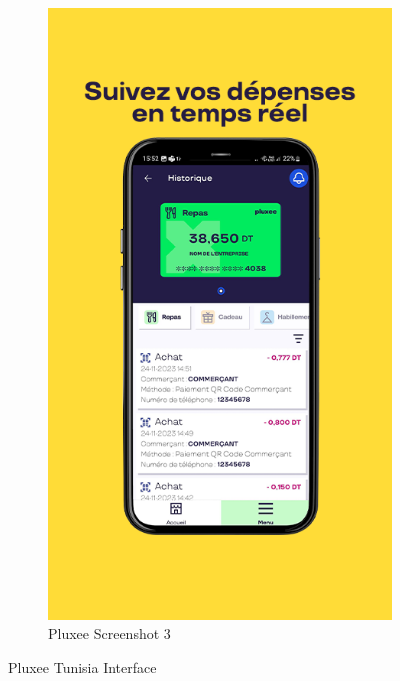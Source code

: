 \begin{figure}[!htb]
\begin{subfigure}[b]{0.32\textwidth}
        \includegraphics[width=\textwidth]{images/pluxee_screenshot_3.png}
        \caption{Pluxee Screenshot 3}
        \label{fig:pluxee_3}
    \end{subfigure}
    \caption{Pluxee Tunisia Interface}
    \label{fig:pluxee_interface}
\end{figure}

